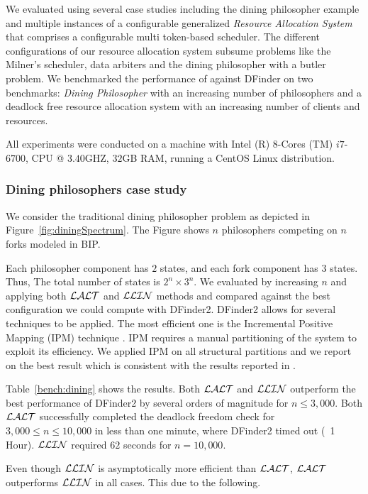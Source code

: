 We evaluated \deadlocktool{} using several case studies including the dining philosopher example and multiple instances
of a configurable generalized {\em Resource Allocation System} that comprises 
a configurable multi token-based scheduler.
The different configurations of our resource allocation system subsume problems like the Milner's scheduler, 
data arbiters and the dining philosopher with a butler problem. 
We benchmarked the performance of \deadlocktool{} against DFinder on two benchmarks: 
{\em Dining Philosopher} with an increasing number of philosophers and 
a deadlock free resource allocation system with an increasing number of clients and resources. 

All experiments were conducted on a machine with Intel (R) $8$-Cores (TM) $i7$-$6700$, CPU @ $3.40$GHZ, $32$GB RAM, 
running a CentOS Linux distribution. 

\subsubsection{Dining philosophers case study} 
We consider the traditional dining philosopher problem as depicted in 
Figure~\ref{fig:diningSpectrum}.
The Figure shows $n$ philosophers competing on $n$ forks modeled in BIP. 

Each philosopher component has $2$ states, and each fork component has $3$ states. 
Thus, The total number of states is $2^n \times 3^n$. 
We evaluated \deadlocktool{} by increasing $n$ and applying both $\mathcal{LALT}$ and $\mathcal{LLIN}$ methods and compared against the best configuration 
we could compute with DFinder2. 
DFinder2 allows for several techniques to be applied. The most efficient one is 
the Incremental Positive Mapping (IPM) technique \cite{DFinder2}. 
IPM requires a manual partitioning of the system to exploit its efficiency. 
We applied IPM on all structural partitions and we report on the best result which is consistent 
with the results reported in . 

Table~\ref{bench:dining} shows the results. Both $\mathcal{LALT}$ and $\mathcal{LLIN}$ outperform the best performance of DFinder2 by several orders of magnitude 
for $n\leq 3,000$. Both $\mathcal{LALT}$ successfully completed the deadlock freedom check for $3,000 \leq n \leq 10,000$ 
in less than one minute, where DFinder2 timed out (~1 Hour). $\mathcal{LLIN}$ required $62$ seconds for $n=10,000$. 


Even though $\mathcal{LLIN}$ is asymptotically more efficient than $\mathcal{LALT}$,
$\mathcal{LALT}$ outperforms $\mathcal{LLIN}$ in all cases. This due to the following. 

